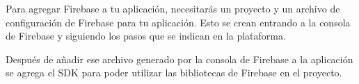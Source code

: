 Para agregar Firebase a tu aplicación, necesitarás un proyecto y un archivo de
configuración de Firebase para tu aplicación. Esto se crean
entrando a la consola de Firebase y siguiendo los pasos 
que se indican en la plataforma.






Después de añadir ese archivo generado por la consola de Firebase a la aplicación
se agrega el SDK para poder utilizar las bibliotecas de Firebase en el proyecto.

